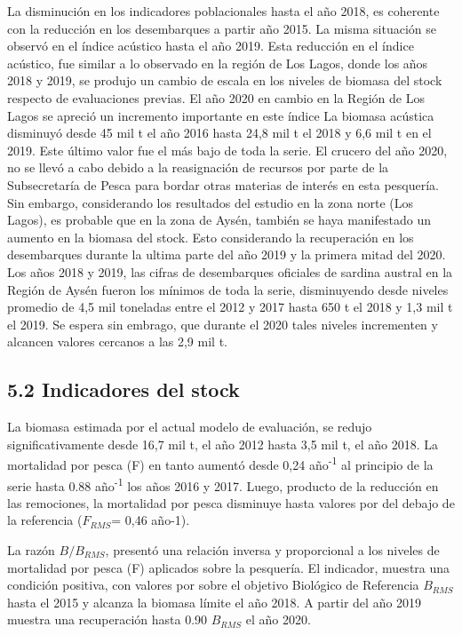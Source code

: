 \documentclass[
  spanish,
]{article}
\begin{document}
La disminución en los indicadores poblacionales hasta el año 2018, es
coherente con la reducción en los desembarques a partir año 2015. La
misma situación se observó en el índice acústico hasta el año 2019. Esta
reducción en el índice acústico, fue similar a lo observado en la región
de Los Lagos, donde los años 2018 y 2019, se produjo un cambio de escala
en los niveles de biomasa del stock respecto de evaluaciones previas. El
año 2020 en cambio en la Región de Los Lagos se apreció un incremento
importante en este índice La biomasa acústica disminuyó desde 45 mil t
el año 2016 hasta 24,8 mil t el 2018 y 6,6 mil t en el 2019. Este último
valor fue el más bajo de toda la serie. El crucero del año 2020, no se
llevó a cabo debido a la reasignación de recursos por parte de la
Subsecretaría de Pesca para bordar otras materias de interés en esta
pesquería. Sin embargo, considerando los resultados del estudio en la
zona norte (Los Lagos), es probable que en la zona de Aysén, también se
haya manifestado un aumento en la biomasa del stock. Esto considerando
la recuperación en los desembarques durante la ultima parte del año 2019
y la primera mitad del 2020. Los años 2018 y 2019, las cifras de
desembarques oficiales de sardina austral en la Región de Aysén fueron
los mínimos de toda la serie, disminuyendo desde niveles promedio de 4,5
mil toneladas entre el 2012 y 2017 hasta 650 t el 2018 y 1,3 mil t el
2019. Se espera sin embrago, que durante el 2020 tales niveles
incrementen y alcancen valores cercanos a las 2,9 mil t.

\hypertarget{indicadores-del-stock}{%
\subsection{5.2 Indicadores del stock}\label{indicadores-del-stock}}

La biomasa estimada por el actual modelo de evaluación, se redujo
significativamente desde 16,7 mil t, el año 2012 hasta 3,5 mil t, el año
2018. La mortalidad por pesca (F) en tanto aumentó desde 0,24
año\textsuperscript{-1} al principio de la serie hasta 0.88
año\textsuperscript{-1} los años 2016 y 2017. Luego, producto de la
reducción en las remociones, la mortalidad por pesca disminuye hasta
valores por del debajo de la referencia (\(F_{RMS}\)= 0,46 año-1).

La razón \(B/B_{RMS}\), presentó una relación inversa y proporcional a
los niveles de mortalidad por pesca (F) aplicados sobre la pesquería. El
indicador, muestra una condición positiva, con valores por sobre el
objetivo Biológico de Referencia \(B_{RMS}\) hasta el 2015 y alcanza la
biomasa límite el año 2018. A partir del año 2019 muestra una
recuperación hasta 0.90 \(B_{RMS}\) el año 2020.
\end{document}
